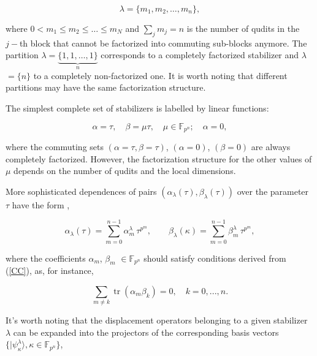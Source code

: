 \documentclass[quantumrep,article,submit,pdftex,moreauthors]{Definitions/mdpi}
\DeclareMathOperator{\tr}{tr}
\begin{document}
\begin{equation}
  \lambda = \{m_{1}, m_{2}, \ldots, m_{n}\},
  \label{curve_part}
\end{equation}

where $0<m_{1}\leq m_{2}\leq \ldots \leq m_{N}$ and $\sum_{j}m_{j}=n$ is the
number of qudits in the $j-$th block that cannot be factorized into commuting
sub-blocks anymore. The partition $\lambda =\underbrace{\{1,1,\ldots ,1\}}_{n}$
corresponds to a completely factorized stabilizer and $\lambda $ $=\{n\}$ to a
completely non-factorized one. It is worth noting that different partitions may
have the same factorization structure.

The simplest complete set of stabilizers is labelled by linear functions:

\begin{equation}
  \alpha = \tau, \quad \beta = \mu \tau, \quad \mu \in \mathbb{F}_{p^{n}};
  \quad \alpha = 0,
  \label{rays}
\end{equation}

where the commuting sets $\left(\alpha = \tau, \beta = \tau \right)$,
$\left(\alpha = 0\right)$, $\left(\beta = 0\right)$ are always completely
factorized.  However, the factorization structure for the other values of $\mu$
depends on the number of qudits and the local dimensions.

More sophisticated dependences of pairs
$\left(\alpha_{\lambda}(\tau),\beta_{\lambda }(\tau)\right)$ over the parameter
$\tau$ have the form \cite{GS2,JPA09},

\begin{equation}
  \alpha_{\lambda }(\tau)
  = \sum_{m=0}^{n-1} \alpha_{m}^{\lambda } \,
  \tau^{p^{m}}, \qquad \beta_{\lambda}(\kappa)
  = \sum_{m=0}^{n-1}\beta_{m}^{\lambda} \, \tau^{p^{m}},
  \label{curve1}
\end{equation}

where the coefficients $\alpha_{m}$, $\beta _{m}$ $\in \mathbb{F}_{p^{n}}$
should satisfy conditions derived from (\ref{CC}), as, for instance,

\begin{equation*}
  \sum_{m \neq k} \tr(\alpha_{m}\beta _{k}) = 0, \quad k = 0,...,n.
\end{equation*}

It's worth noting that the displacement operators belonging to a given
stabilizer $\lambda $ can be expanded into the projectors of the corresponding
basis vectors $\{|\psi _{\kappa }^{\lambda }\rangle ,\kappa \in
\mathbb{F}_{p^{n}}\}$,
\end{document}
